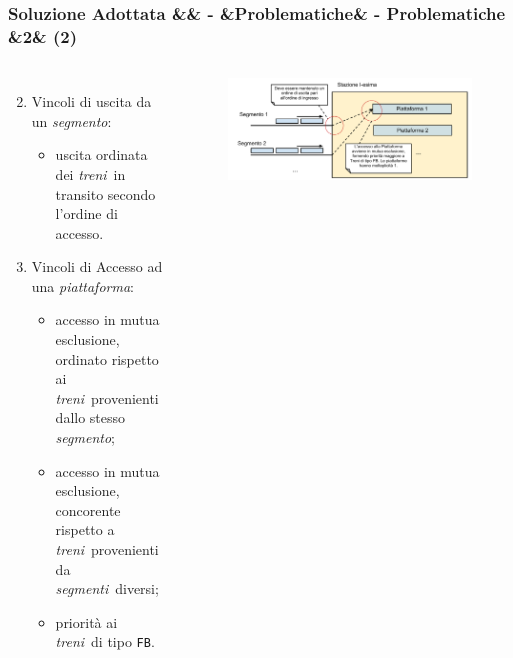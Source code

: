 \documentclass[slidestop,compress,blackandwhite]{beamer}
\newcommand{\ttt}[1]{\texttt{#1}}
\newcommand{\ii}[1]{\textit{#1}}
\newcommand{\treni}{\ii{treni}}
\newcommand{\piattaforma}{\ii{piattaforma}}
\newcommand{\segmento}{\ii{segmento}}
\newcommand{\segmenti}{\ii{segmenti}}
\newcommand{\newtitle}[4]{
	#1 
	\ifx&#2&%
	\else
  		\large- #2
	\fi
	\ifx&#3&%
	\else
  		\normalsize- #3
	\fi
	\ifx&#4&%
	\else
  		\normalsize (#4)
	\fi
}
\newcommand{\newframe}[5]{
	\begin{frame}
		\frametitle{\newtitle{#1}{#2}{#3}{#4}}
		#5
	\end{frame}
}
\newcommand{\myitemize}[1]{\begin{itemize}#1\end{itemize}}
\begin{document}
	\newframe{Soluzione Adottata}{}{Problematiche}{2}{
		\begin{columns}[c]
		\column{0.6\textwidth}
		\begin{enumerate}
			\setcounter{enumi}{1}
			\item Vincoli di uscita da un \segmento:
				\myitemize{
					\item uscita ordinata dei \treni~in transito secondo l'ordine di accesso.
				}
			\item Vincoli di Accesso ad una \piattaforma:
				\myitemize{
					\item accesso in mutua esclusione, ordinato rispetto ai \treni~provenienti dallo stesso \segmento;
					\item accesso in mutua esclusione, concorente rispetto a \treni~provenienti da \segmenti~diversi;
					\item priorità ai \treni~di tipo \ttt{FB}.
				}
		\end{enumerate}
		\column{0.5\textwidth}
		\begin{figure}
			\includegraphics[scale=0.27,trim=30mm 0mm 0mm 0mm]{imgs/Ingresso_Stazione.pdf}
		\end{figure}
		\end{columns}
	}
	
\end{document}
